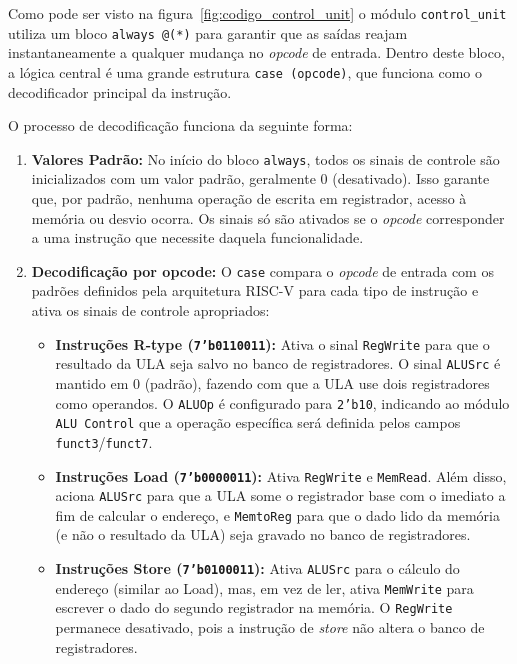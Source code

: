 \documentclass[12pt]{article}
\begin{document}
Como pode ser visto na figura~\ref{fig:codigo_control_unit} o módulo \texttt{control\_unit} utiliza um bloco \texttt{always @(*)} para garantir que as saídas reajam instantaneamente a qualquer mudança no \textit{opcode} de entrada. Dentro deste bloco, a lógica central é uma grande estrutura \texttt{case (opcode)}, que funciona como o decodificador principal da instrução.

O processo de decodificação funciona da seguinte forma:

\begin{enumerate}
    \item \textbf{Valores Padrão:} No início do bloco \texttt{always}, todos os sinais de controle são inicializados com um valor padrão, geralmente 0 (desativado). Isso garante que, por padrão, nenhuma operação de escrita em registrador, acesso à memória ou desvio ocorra. Os sinais só são ativados se o \textit{opcode} corresponder a uma instrução que necessite daquela funcionalidade.

    \item \textbf{Decodificação por opcode:} O \texttt{case} compara o \textit{opcode} de entrada com os padrões definidos pela arquitetura RISC-V para cada tipo de instrução e ativa os sinais de controle apropriados:
    \begin{itemize}
        \item \textbf{Instruções R-type (\texttt{7'b0110011}):} Ativa o sinal \texttt{RegWrite} para que o resultado da ULA seja salvo no banco de registradores. O sinal \texttt{ALUSrc} é mantido em 0 (padrão), fazendo com que a ULA use dois registradores como operandos. O \texttt{ALUOp} é configurado para \texttt{2'b10}, indicando ao módulo \texttt{ALU Control} que a operação específica será definida pelos campos \texttt{funct3}/\texttt{funct7}.
        
        \item \textbf{Instruções Load (\texttt{7'b0000011}):} Ativa \texttt{RegWrite} e \texttt{MemRead}. Além disso, aciona \texttt{ALUSrc} para que a ULA some o registrador base com o imediato a fim de calcular o endereço, e \texttt{MemtoReg} para que o dado lido da memória (e não o resultado da ULA) seja gravado no banco de registradores.
        
        \item \textbf{Instruções Store (\texttt{7'b0100011}):} Ativa \texttt{ALUSrc} para o cálculo do endereço (similar ao Load), mas, em vez de ler, ativa \texttt{MemWrite} para escrever o dado do segundo registrador na memória. O \texttt{RegWrite} permanece desativado, pois a instrução de \textit{store} não altera o banco de registradores.
        

\end{itemize}
\end{enumerate}
\end{document}
